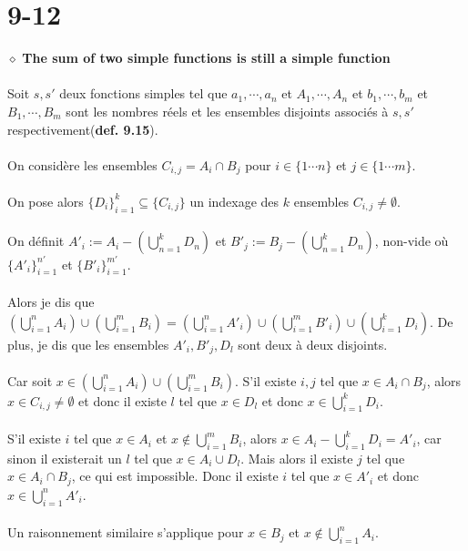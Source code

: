 \documentclass[a4paper,10pt]{article}
\begin{document}
\section*{9-12}
$\diamond$ \textbf{The sum of two simple functions is still a simple function}
\\
\\
Soit $s, s'$ deux fonctions simples tel que $a_1, \cdots , a_n$ et $A_1, \cdots , A_n$ et $b_1, \cdots , b_m$ et $B_1, \cdots , B_m$ sont les nombres réels et les ensembles disjoints associés à $s, s'$ respectivement(\textbf{def. 9.15}). 
\\
\\
On considère les ensembles $C_{i,j} = A_i \cap B_j$ pour $i \in \{1 \cdots n\}$ et $j \in \{1 \cdots m \}$.
\\
\\
On pose alors $\{ D_i \}_{i = 1}^k \subseteq \{ C_{i,j} \}$ un indexage des $k$ ensembles $C_{i,j} \not = \emptyset$.
\\
\\
On définit $A'_i := A_i - \left ( \bigcup_{n=1}^{k} D_n \right )$ et $B'_j := B_j - \left ( \bigcup_{n=1}^{k} D_n \right )$, non-vide où $\{ A'_i \}_{i=1}^{n'}$ et $\{ B'_i \}_{i=1}^{m'}$.
\\
\\
Alors je dis que $ \left( \bigcup_{i=1}^n A_i \right) \cup \left( \bigcup_{i=1}^m B_i \right) = \left( \bigcup_{i=1}^n A'_i \right) \cup \left( \bigcup_{i=1}^m B'_i \right) \cup \left( \bigcup_{i=1}^k D_i \right)$. De plus, je dis que les ensembles $A'_i, B'_j, D_l$ sont deux à deux disjoints.
\\
\\
Car soit $x \in \left( \bigcup_{i=1}^n A_i \right) \cup \left( \bigcup_{i=1}^m B_i \right)$. S'il existe $i,j$ tel que $x \in A_i \cap B_j$, alors $x \in C_{i,j} \not = \emptyset$ et donc il existe $l$ tel que $x \in D_l$ et donc $x \in \bigcup_{i=1}^k D_i$.
\\
\\
S'il existe $i$ tel que $x \in A_i$ et $x \not \in \bigcup_{i=1}^m B_i$, alors $x \in A_i - \bigcup_{i=1}^k D_i = A'_i$, car sinon il existerait un $l$ tel que $x \in A_i \cup D_l$. Mais alors il existe $j$ tel que $x \in A_i \cap B_j$, ce qui est impossible. Donc il existe $i$ tel que $x \in A'_i$ et donc $x \in \bigcup_{i = 1}^n A'_i$. 
\\
\\
Un raisonnement similaire s'applique pour $x \in B_j$ et $x \not \in \bigcup_{i=1}^n A_i$.
\\
\end{document}
